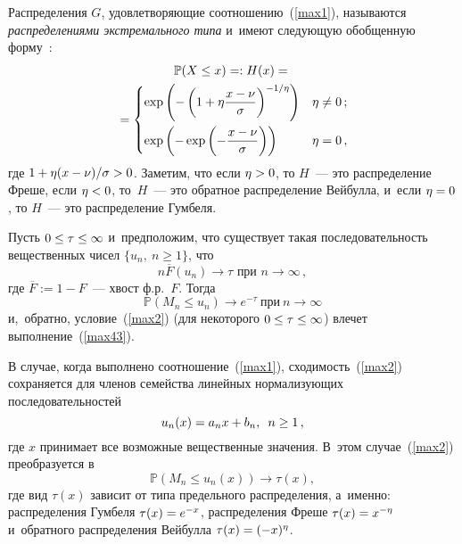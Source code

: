 \begin{multicols}{2}
Распределения $G$, удовлетворяющие  соотношению~(\ref{max1}), называются \textit{распределениями 
экстремального типа}  и~имеют сле\-ду\-ющую обобщенную форму~\cite{embrehts}:
\begin{multline*}
    \mathbb{P}(X \le x)=: H(x)={}\\
    {}=
    \begin{cases}
    \exp \left (-\left( 1+\eta  \displaystyle\frac{\displaystyle x-\nu\mathstrut}{\displaystyle \sigma\mathstrut}\right)^{-1/{\eta}} \right) & \eta\ne 0\,;\\[12pt]
\exp \left ( - \exp \left(- \displaystyle\frac{\displaystyle x-\nu\mathstrut}{\displaystyle \sigma\mathstrut}\right)  \right) & \eta=0\,,
\end{cases}
\end{multline*}
где  $ 1+ \eta (x-\nu)/\sigma \hm> 0$.
Заметим, что
если   $\eta \hm>0$, то   $H$~--- это распределение Фреше, если $\eta \hm< 0$,  
то~$H$~--- это обратное распределение Вейбулла, и~если $\eta \hm=0$, то  $H$~--- это 
распределение Гумбеля.



Пусть $0\le \tau\hm \le \infty$ и~предположим, что  существует такая 
последовательность вещественных чисел
$\{u_n, \ n\ge 1\}$, что
\begin{equation}
\label{max43}
    n\overline F(u_n) \to \tau \mbox{ при } n\to \infty\,,
\end{equation}
где $\overline F:=1-F$~--- хвост ф.р.~$F$. Тогда \cite{Leadbetter}
\begin{equation}
\label{max2}
\mathbb{P} \left(M_n \le u_n \right) \to e^{-\tau} \ \mbox{при} \ n\to \infty
\end{equation}
и,~обратно, условие~(\ref{max2}) (для некоторого $0\hm\le \tau \hm\le \infty$) влечет 
выполнение~(\ref{max43}).

В случае, когда выполнено соотношение~(\ref{max1}),  сходимость~(\ref{max2}) 
сохраняется  для членов семейства линейных нормализующих последовательностей  
$$
u_n (x)=  a_n x + b_n,\enskip n\ge 1\,,
$$
где $x$ принимает все возможные вещественные значения. В~этом случае~(\ref{max2}) преобразуется
в~$$
\mathbb{P}\left(M_n  \le u_n(x)\right) \to \tau(x),
$$
где вид $\tau(x)$  зависит от  типа предельного распределения, а~именно:  
распределения Гумбеля $\tau(x)\hm=e^{-x}$,  распределения Фреше $\tau(x)\hm=x^{-\eta}$  
и~обратного распределения Вейбулла $\tau(x)\hm=(-x)^{\eta}$.


\end{multicols}
